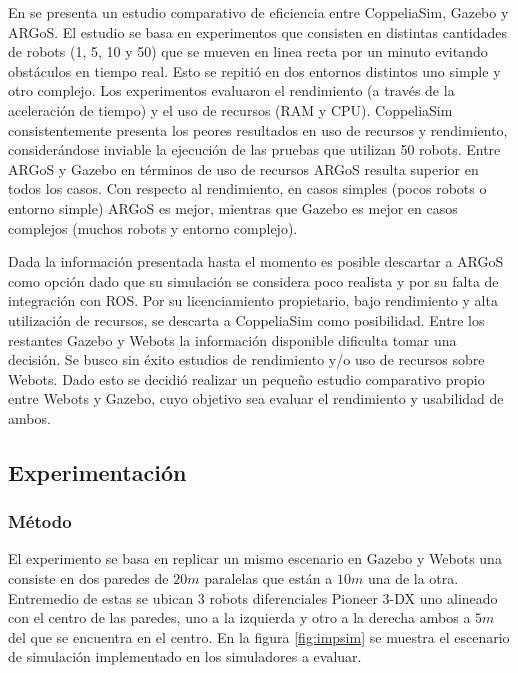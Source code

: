 En \cite{Pitonakova2018} se presenta un estudio comparativo de eficiencia entre
CoppeliaSim, Gazebo y ARGoS. El estudio se basa en experimentos que consisten
en distintas cantidades de robots (1, 5, 10 y 50) que se mueven en linea recta por un minuto
evitando obstáculos en tiempo real. Esto se repitió en dos entornos distintos
uno simple y otro complejo. Los experimentos evaluaron el rendimiento (a través
de la aceleración de tiempo) y el uso de recursos (RAM y CPU). CoppeliaSim
consistentemente presenta los peores resultados en uso de recursos y
rendimiento, considerándose inviable la ejecución de las pruebas que utilizan
50 robots. Entre ARGoS y Gazebo en términos de uso de recursos ARGoS resulta
superior en todos los casos. Con respecto al rendimiento, en casos simples
(pocos robots o entorno simple) ARGoS es mejor, mientras que Gazebo es mejor en
casos complejos (muchos robots y entorno complejo).

Dada la información presentada hasta el momento es posible descartar a ARGoS como
opción dado que su simulación se considera poco realista y por su falta de
integración con ROS. Por su licenciamiento propietario, bajo rendimiento y alta
utilización de recursos, se descarta a CoppeliaSim como posibilidad. Entre los
restantes Gazebo y Webots la información disponible dificulta tomar una
decisión. Se busco sin éxito estudios de rendimiento y/o uso de recursos sobre
Webots. Dado esto se decidió realizar un pequeño estudio comparativo propio
entre Webots y Gazebo, cuyo objetivo sea evaluar el rendimiento y usabilidad de
ambos.

\subsection{Experimentación}

\subsubsection{Método}
El experimento se basa en replicar un mismo escenario en Gazebo y Webots una
consiste en dos paredes de $20m$ paralelas que están a $10m$ una de la otra.
Entremedio de estas se ubican 3 robots diferenciales Pioneer 3-DX \cite{p3dx} uno alineado
con el centro de las paredes, uno a la izquierda y otro a la derecha ambos a
$5m$ del que se encuentra en el centro. En la figura \ref{fig:impsim} se
muestra el escenario de simulación implementado en los simuladores a evaluar.

